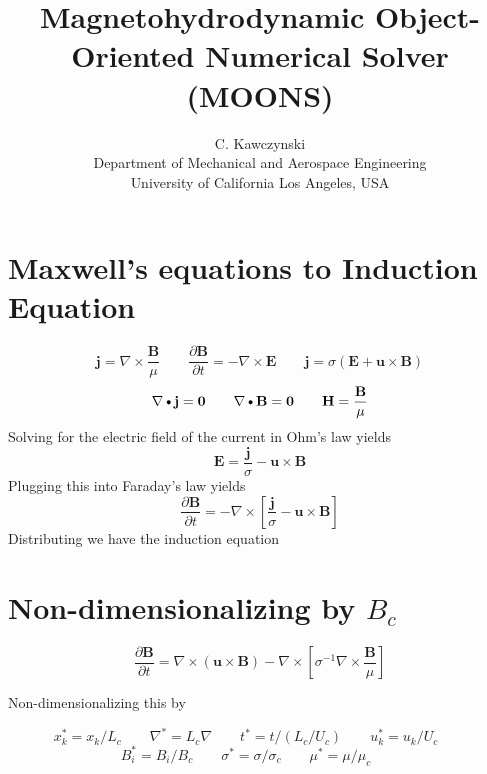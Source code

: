 \documentclass[11pt]{article}
\newcommand{\B}{\mathbf{B}}
\newcommand{\PD}{\partial}
\newcommand{\BM}{\frac{\mathbf{B}}{\mu}}
\newcommand{\J}{\mathbf{j}}
\newcommand{\E}{\mathbf{E}}
\newcommand{\U}{\mathbf{u}}
\newcommand{\SII}{\sigma^{-1}}
\newcommand{\DOT}{\text{\textbullet}}
\begin{document}
\doublespacing
\title{Magnetohydrodynamic Object-Oriented Numerical Solver (MOONS)}
\author{C. Kawczynski \\
Department of Mechanical and Aerospace Engineering \\
University of California Los Angeles, USA\\
}
\maketitle

\section{Maxwell's equations to Induction Equation}
\begin{equation}
	\J = \nabla \times \BM
	\qquad
	\frac{\PD \B}{\PD t} = 
	- \nabla \times \E
	\qquad
	\J = \sigma (\E + \U \times \B)
\end{equation}
\begin{equation}
	\nabla \DOT \J = \mathbf{0}
	\qquad
	\nabla \DOT \B = \mathbf{0}
	\qquad
	\mathbf{H} = \BM
\end{equation}
Solving for the electric field of the current in Ohm's law yields
\begin{equation}
	\E = \frac{\J}{\sigma} - \U \times \B
\end{equation}
Plugging this into Faraday's law yields
\begin{equation}
	\frac{\PD \B}{\PD t} = 
	- \nabla \times \left[ \frac{\J}{\sigma}
	- \U \times \B \right]
\end{equation}
Distributing we have the induction equation

\section{Non-dimensionalizing by \texorpdfstring{$B_c$}{LG}}

\begin{equation}
	\frac{\PD \B}{\PD t} = 
	\nabla \times (\U \times \B)
	- \nabla \times 
	\left[ \SII
	\nabla \times \BM \right]
\end{equation}

Non-dimensionalizing this by

\begin{equation*}
	x_k^* = x_k/L_c \qquad
	\nabla^* = L_c \nabla \qquad
	t^* = t/(L_c/U_c) \qquad
	u_k^* = u_k/U_c \qquad
	\end{equation*}
	\begin{equation*}
	B_i^* = B_i/B_c  \qquad
	\sigma^* = \sigma/\sigma_c \qquad
	\mu^* = \mu/\mu_c \qquad
\end{equation*}
\end{document}
